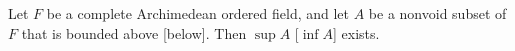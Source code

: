 Let $F$ be a complete Archimedean ordered field, and let $A$ be a nonvoid subset of $F$ that is bounded above [below]. Then $\sup A$ [$\inf A$] exists.